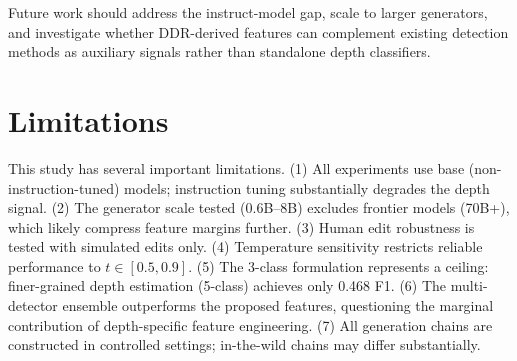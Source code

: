 \documentclass[11pt]{article}
\begin{document}
Future work should address the instruct-model gap, scale to larger generators, and investigate whether DDR-derived features can complement existing detection methods as auxiliary signals rather than standalone depth classifiers.

\section*{Limitations}

This study has several important limitations. (1) All experiments use base (non-instruction-tuned) models; instruction tuning substantially degrades the depth signal. (2) The generator scale tested (0.6B--8B) excludes frontier models (70B+), which likely compress feature margins further. (3) Human edit robustness is tested with simulated edits only. (4) Temperature sensitivity restricts reliable performance to $t \in [0.5, 0.9]$. (5) The 3-class formulation represents a ceiling: finer-grained depth estimation (5-class) achieves only 0.468 F1. (6) The multi-detector ensemble outperforms the proposed features, questioning the marginal contribution of depth-specific feature engineering. (7) All generation chains are constructed in controlled settings; in-the-wild chains may differ substantially.


\end{document}
